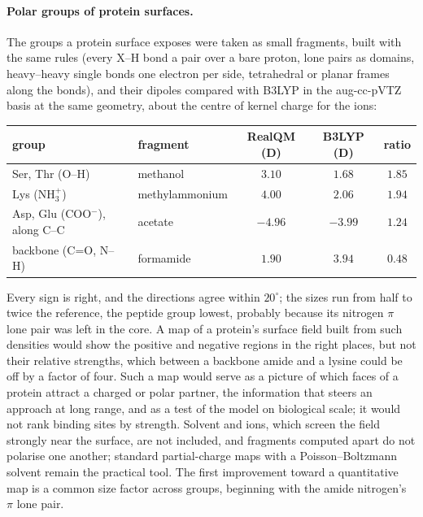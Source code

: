 \documentclass[11pt]{article}
\begin{document}
\paragraph{Polar groups of protein surfaces.} The groups a protein surface exposes were taken as small fragments, built
with the same rules (every X--H bond a pair over a bare proton, lone pairs as domains, heavy--heavy single bonds one
electron per side, tetrahedral or planar frames along the bonds), and their dipoles compared with B3LYP in the
aug-cc-pVTZ basis at the same geometry, about the centre of kernel charge for the ions:
\begin{center}
\small
\begin{tabular}{llccc}
\toprule
group & fragment & RealQM (D) & B3LYP (D) & ratio \\
\midrule
Ser, Thr (O--H) & methanol & $3.10$ & $1.68$ & $1.85$ \\
Lys (NH$_3^+$) & methylammonium & $4.00$ & $2.06$ & $1.94$ \\
Asp, Glu (COO$^-$), along C--C & acetate & $-4.96$ & $-3.99$ & $1.24$ \\
backbone (C=O, N--H) & formamide & $1.90$ & $3.94$ & $0.48$ \\
\bottomrule
\end{tabular}
\end{center}
Every sign is right, and the directions agree within $20^\circ$; the sizes run from half to twice the reference, the
peptide group lowest, probably because its nitrogen $\pi$ lone pair was left in the core. A map of a protein's
surface field built from such densities would show the positive and negative regions in the right places, but not
their relative strengths, which between a backbone amide and a lysine could be off by a factor of four. Such a map
would serve as a picture of which faces of a protein attract a charged or polar partner, the information that
steers an approach at long range, and as a test of the model on biological scale; it would not rank binding sites
by strength. Solvent and ions, which screen the field strongly near the surface, are not included, and fragments
computed apart do not polarise one another; standard partial-charge maps with a Poisson--Boltzmann solvent remain the
practical tool. The first improvement toward a quantitative map is a common size factor across groups, beginning
with the amide nitrogen's $\pi$ lone pair.
\end{document}
